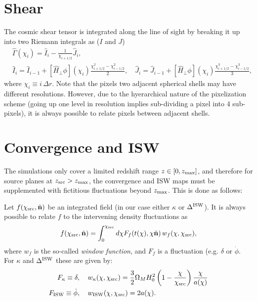 \documentclass[a4paper,10pt]{article}
\newcommand{\nv}{\hat{\bf n}}
\begin{document}
\section{Shear}
  The cosmic shear tensor is integrated along the line of sight by breaking it up into two Riemann integrals as ($I$ and $J$) 
  \begin{align}
    &\hat{\Gamma}(\chi_i)=\hat{I}_{i}-\frac{1}{\chi_{i+1/2}}\hat{J}_{i},\\
    &\hat{I}_{i}=\hat{I}_{i-1}+[\hat{H}_\perp\phi](\chi_i)\frac{\chi_{i+1/2}^2-\chi_{i-1/2}^2}{2},\hspace{12pt}
    \hat{J}_{i}=\hat{J}_{i-1}+[\hat{H}_\perp\phi](\chi_i)\frac{\chi_{i+1/2}^3-\chi_{i-1/2}^3}{3},
  \end{align}
  where $\chi_i\equiv i\,\Delta r$. Note that the pixels two adjacent spherical shells may have different resolutions. However, due to the hyerarchical nature of the pixelization scheme (going up one level in resolution implies sub-dividing a pixel into 4 sub-pixels), it is always possible to relate pixels between adjacent shells.

\section{Convergence and ISW}
  The simulations only cover a limited redshift range $z\in[0,z_{\rm max}]$, and therefore for source planes at $z_{\rm src}>z_{\rm max}$, the convergence and ISW maps must be supplemented with fictitious fluctuations beyond $z_{\rm max}$. This is done as follows:
  
  Let $f(\chi_{\rm src},\nv)$ be an integrated field (in our case either $\kappa$ or $\Delta^{\rm ISW}$). It is always possible to relate $f$ to the intervening density fluctuations as
  \begin{equation}
    f(\chi_{\rm src},\nv)=\int_0^{\chi_{\rm src}}d\chi F_f(t(\chi),\chi\nv)\,w_f(\chi,\chi_{\rm src}),
  \end{equation}
  where $w_f$ is the so-called {\sl window function}, and $F_f$ is a fluctuation (e.g. $\delta$ or $\dot{\phi}$. For $\kappa$ and $\Delta^{\rm ISW}$ these are given by:
  \begin{align}
    F_\kappa\equiv\delta,\hspace{12pt}&w_\kappa(\chi,\chi_{\rm src})=\frac{3}{2}\Omega_MH_0^2\left(1-\frac{\chi}{\chi_{\rm src}}\right)\frac{\chi}{a(\chi)}\\
    F_{\rm ISW}\equiv\dot{\phi},\hspace{12pt}&w_{\rm ISW}(\chi,\chi_{\rm src})=2a(\chi).
  \end{align}
  
\end{document}

